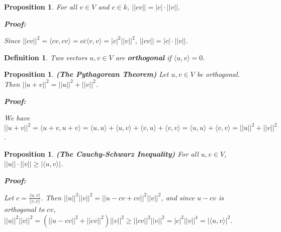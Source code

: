 \documentclass{article}
\theoremstyle{colontheorem}
\newtheorem{proposition}[theorem]{Proposition}
\newtheorem{definition}[theorem]{Definition}
\newenvironment{Proposition}
{
	\begin{mdframed}[backgroundcolor=PropPink!10]
	\begin{proposition}
}
{
	\end{proposition}
	\end{mdframed}
	
	\vspace{.15in}
}
\newenvironment{Def}
{
	\begin{mdframed}[backgroundcolor=DefGreen!10]
	\begin{definition}
}
{
	\end{definition}
	\end{mdframed}
	
	\vspace{.15in}
}
\newenvironment{Proof}
{
	\begin{mdframed}[backgroundcolor=ProofPurple!10]
	\textbf{Proof:}%
}
{
	\end{mdframed}
	
	\vspace{.085in}
}
\begin{document}
\begin{Proposition}
	
	For all $v \in V$ and $c \in k$, $||cv|| = |c| \cdot ||v||$.
	
	\begin{Proof}
		Since $||cv||^2 = \langle cv, cv \rangle = c \overline{c} \langle v, v \rangle = |c|^2 ||v||^2$, $||cv|| = |c| \cdot ||v||$.
		
	\end{Proof}
	
\end{Proposition}



\begin{Def}
	
	Two vectors $u, v \in V$ are \textbf{orthogonal} if $\langle u, v \rangle = 0$.
	
\end{Def}



\begin{Proposition}
	
	\textbf{(The Pythagorean Theorem)} Let $u, v \in V$ be orthogonal. Then $||u + v||^2 = ||u||^2 + ||v||^2$.
	
	\begin{Proof}
		We have $||u + v||^2 = \langle u+v, u+v \rangle = \langle u, u \rangle + \langle u, v \rangle + \langle v, u \rangle + \langle v, v \rangle = \langle u, u \rangle + \langle v, v \rangle = ||u||^2 + ||v||^2$.
		
	\end{Proof}
	
\end{Proposition}



\begin{Proposition}
	
	\textbf{(The Cauchy-Schwarz Inequality)} For all $u, v \in V$, $||u|| \cdot ||v|| \geq | \langle u, v \rangle |$.
	
	\begin{Proof}
		Let $c = \frac{\langle u, v \rangle}{\langle v, v \rangle}$. Then $||u||^2 ||v||^2 = ||u - cv + cv||^2 ||v||^2$, and since $u - cv$ is orthogonal to $cv$, $||u||^2 ||v||^2 = \left( ||u - cv||^2 + ||cv||^2 \right) ||v||^2 \geq ||cv||^2 ||v||^2 = |c|^2 ||v||^4 = | \langle u, v \rangle |^2$.
		
	\end{Proof}
	
\end{Proposition}
\end{document}
